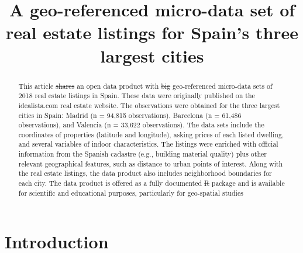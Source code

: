 \documentclass[Royal,times,sageh]{sagej}
\providecommand{\DIFaddtex}[1]{{\protect\color{blue}\uwave{#1}}} %
\providecommand{\DIFdeltex}[1]{{\protect\color{red}\sout{#1}}}                      %
\providecommand{\DIFaddbegin}{} %
\providecommand{\DIFaddend}{} %
\providecommand{\DIFdelbegin}{} %
\providecommand{\DIFdelend}{} %
\providecommand{\DIFadd}[1]{\texorpdfstring{\DIFaddtex{#1}}{#1}} %
\providecommand{\DIFdel}[1]{\texorpdfstring{\DIFdeltex{#1}}{}} %
\begin{document}

\title{A geo-referenced micro-data set of real estate listings for
Spain's three largest cities}


\author{\affilnum{}}

\affiliation{}



\begin{abstract}
This article \DIFdelbegin \DIFdel{shares }\DIFdelend \DIFaddbegin \DIFadd{presents }\DIFaddend an open data product with \DIFdelbegin \DIFdel{big }\DIFdelend \DIFaddbegin \DIFadd{large }\DIFaddend geo-referenced
micro-data sets of 2018 real estate listings in Spain. These data were
originally published on the idealista.com real estate website. The
observations were obtained for the three largest cities in Spain: Madrid
(n = 94,815 observations), Barcelona (n = 61,486 observations), and
Valencia (n = 33,622 observations). The data sets include the
coordinates of properties (latitude and longitude), asking prices of
each listed dwelling, and several variables of indoor characteristics.
The listings were enriched with official information from the Spanish
cadastre (e.g., building material quality) plus other relevant
geographical features, such as distance to urban points of interest.
Along with the real estate listings, the data product also includes
neighborhood boundaries for each city. The data product is offered as a
fully documented \DIFdelbegin \DIFdel{R }\DIFdelend \DIFaddbegin \texttt{\DIFadd{R}} \DIFaddend package and is available for scientific and
educational purposes, particularly for geo-spatial studies
\end{abstract}

\DIFdelbegin %
\DIFdelend \DIFaddbegin {}
\DIFaddend 

\maketitle

\hypertarget{introduction}{%
\section{Introduction}\label{introduction}}
\end{document}
